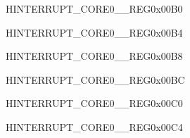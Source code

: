 \begin{register}{H}{INTERRUPT\_CORE0\_\_REG}{0x00B0}\label{regdesc:INTERRUPTCORE0DMACH0INTMAPREG}






\end{register}\vspace{-3em}


\begin{register}{H}{INTERRUPT\_CORE0\_\_REG}{0x00B4}\label{regdesc:INTERRUPTCORE0DMACH1INTMAPREG}






\end{register}\vspace{-3em}


\begin{register}{H}{INTERRUPT\_CORE0\_\_REG}{0x00B8}\label{regdesc:INTERRUPTCORE0DMACH2INTMAPREG}






\end{register}\vspace{-3em}


\begin{register}{H}{INTERRUPT\_CORE0\_\_REG}{0x00BC}\label{regdesc:INTERRUPTCORE0RSAINTMAPREG}






\end{register}\vspace{-3em}


\begin{register}{H}{INTERRUPT\_CORE0\_\_REG}{0x00C0}\label{regdesc:INTERRUPTCORE0AESINTMAPREG}






\end{register}\vspace{-3em}


\begin{register}{H}{INTERRUPT\_CORE0\_\_REG}{0x00C4}\label{regdesc:INTERRUPTCORE0SHAINTMAPREG}






\end{register}\vspace{-3em}



